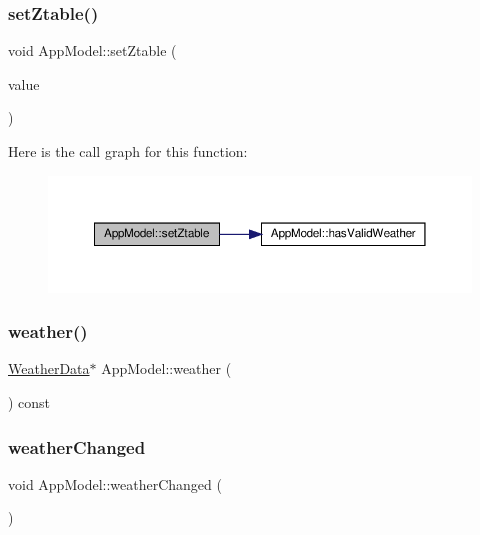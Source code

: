 \subsubsection{\texorpdfstring{set\+Ztable()}{setZtable()}}
{\footnotesize\ttfamily void App\+Model\+::set\+Ztable (\begin{DoxyParamCaption}\item[{const Q\+Json\+Document \&}]{value }\end{DoxyParamCaption})}

Here is the call graph for this function\+:\nopagebreak
\begin{figure}[H]
\begin{center}
\leavevmode
\includegraphics[width=350pt]{class_app_model_ad4f010e1e4244d90cd648c6806dcda4e_cgraph}
\end{center}
\end{figure}
\mbox{\label{class_app_model_a70a5bec8e359e4edbd16611efa96cf32}} 
\subsubsection{\texorpdfstring{weather()}{weather()}}
{\footnotesize\ttfamily \hyperlink{class_weather_data}{Weather\+Data}$\ast$ App\+Model\+::weather (\begin{DoxyParamCaption}{ }\end{DoxyParamCaption}) const}

\mbox{\label{class_app_model_a83e61455ed5672333b0db45f3f86417c}} 
\subsubsection{\texorpdfstring{weather\+Changed}{weatherChanged}}
{\footnotesize\ttfamily void App\+Model\+::weather\+Changed (\begin{DoxyParamCaption}{ }\end{DoxyParamCaption})\hspace{0.3cm}{\ttfamily [signal]}}



